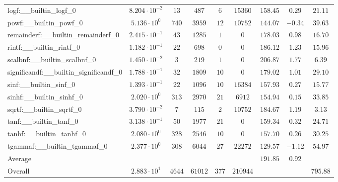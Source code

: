 \begin{tabular}{|l|c|c|c|c|c|c|c|c|}
logf:\_\_builtin\_logf\_0                 & $ 8.204 \cdot 10^{-2} $ & $ 13     $ & $ 487   $ & $ 6   $ & $ 15360  $ & $ 158.45      $ & $ 0.29    $ & $ 21.11   $ \\
powf:\_\_builtin\_powf\_0                 & $ 5.136 \cdot 10^{0}  $ & $ 740    $ & $ 3959  $ & $ 12  $ & $ 10752  $ & $ 144.07      $ & $ -0.34   $ & $ 39.63   $ \\
remainderf:\_\_builtin\_remainderf\_0     & $ 2.415 \cdot 10^{-1} $ & $ 43     $ & $ 1285  $ & $ 1   $ & $ 0      $ & $ 178.03      $ & $ 0.98    $ & $ 16.70   $ \\
rintf:\_\_builtin\_rintf\_0               & $ 1.182 \cdot 10^{-1} $ & $ 22     $ & $ 698   $ & $ 0   $ & $ 0      $ & $ 186.12      $ & $ 1.23    $ & $ 15.96   $ \\
scalbnf:\_\_builtin\_scalbnf\_0           & $ 1.450 \cdot 10^{-2} $ & $ 3      $ & $ 219   $ & $ 1   $ & $ 0      $ & $ 206.87      $ & $ 1.77    $ & $ 6.39    $ \\
significandf:\_\_builtin\_significandf\_0 & $ 1.788 \cdot 10^{-1} $ & $ 32     $ & $ 1809  $ & $ 10  $ & $ 0      $ & $ 179.02      $ & $ 1.01    $ & $ 29.10   $ \\
sinf:\_\_builtin\_sinf\_0                 & $ 1.393 \cdot 10^{-1} $ & $ 22     $ & $ 1096  $ & $ 10  $ & $ 16384  $ & $ 157.93      $ & $ 0.27    $ & $ 15.77   $ \\
sinhf:\_\_builtin\_sinhf\_0               & $ 2.020 \cdot 10^{0}  $ & $ 313    $ & $ 2970  $ & $ 21  $ & $ 6912   $ & $ 154.94      $ & $ 0.15    $ & $ 33.85   $ \\
sqrtf:\_\_builtin\_sqrtf\_0               & $ 3.790 \cdot 10^{-2} $ & $ 7      $ & $ 115   $ & $ 2   $ & $ 10752  $ & $ 184.67      $ & $ 1.19    $ & $ 3.13    $ \\
tanf:\_\_builtin\_tanf\_0                 & $ 3.138 \cdot 10^{-1} $ & $ 50     $ & $ 1977  $ & $ 21  $ & $ 0      $ & $ 159.34      $ & $ 0.32    $ & $ 24.71   $ \\
tanhf:\_\_builtin\_tanhf\_0               & $ 2.080 \cdot 10^{0}  $ & $ 328    $ & $ 2546  $ & $ 10  $ & $ 0      $ & $ 157.70      $ & $ 0.26    $ & $ 30.25   $ \\
tgammaf:\_\_builtin\_tgammaf\_0           & $ 2.377 \cdot 10^{0}  $ & $ 308    $ & $ 6044  $ & $ 27  $ & $ 22272  $ & $ 129.57      $ & $ -1.12   $ & $ 54.97   $ \\
\hline
Average                                   & $                     $ & $        $ & $       $ & $     $ & $        $ & $ 191.85      $ & $ 0.92    $ & $         $ \\
\hline
Overall                                   & $ 2.883 \cdot 10^{1}  $ & $ 4644   $ & $ 61012 $ & $ 377 $ & $ 210944 $ & $             $ & $         $ & $ 795.88  $ \\
\hline
\end{tabular}
